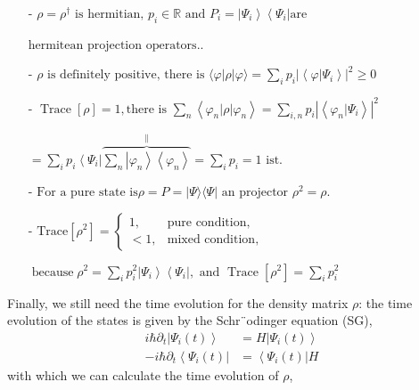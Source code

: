 \begin{enumerate}
    \item[-] $\rho=\rho^{\dagger} \text { is hermitian, } p_{i} \in \mathbb{R} \text { and } P_{i}=\left|\Psi_{i}\right\rangle\left\langle\Psi_{i}\right| \text {are}$ 
    \item[]$\text{hermitean projection operators.}$.
    \item[-] $\rho \text { is definitely positive, there is }\langle\varphi|\rho| \varphi\rangle=\sum_{i} p_{i}\left|\left\langle\varphi | \Psi_{i}\right\rangle\right|^{2}  \geq 0$ 
    \item[-] $\operatorname{Trace}[\rho]=1, \text{there is } \sum_{n}\left\langle\varphi_{n}|\rho| \varphi_{n}\right\rangle=\sum_{i, n} p_{i}\left|\left\langle\varphi_{n} | \Psi_{i}\right\rangle\right|^{2}$ 
    \item[] $=\sum_{i} p_{i}\left\langle\Psi_{i}\right| \overbrace{\sum_{n}\left|\varphi_{n}\right\rangle\left\langle\varphi_{n}\right\rangle}^{\|}=\sum_{i} p_{i}=1 \text { ist. }$ 
    \item[-] $\text{For a pure state is}\rho=P=|\Psi\rangle\langle\Psi| \text{ an projector } \rho^{2}=\rho$.
     
    \item[-] $\text{Trace}[\rho^2]=\left\{
        \begin{array}{ll}
            1, & \text{pure condition},\\
            <1, & \text{mixed condition},
        \end{array} 
        \right.$
    \item[] $\operatorname{because} \rho^{2}=\sum_{i} p_{i}^{2}\left|\Psi_{i}\right\rangle\left\langle\Psi_{i}\right|, \text { and } \operatorname{Trace}\left[\rho^{2}\right]=\sum_{i} p_{i}^{2}$ 
\end{enumerate}
Finally, we still need the time evolution for the density matrix $\rho$: the time evolution of the states is given by the Schr¨odinger equation (SG),
\begin{equation}
\begin{aligned} i \hbar \partial_{t}\left|\Psi_{i}(t)\right\rangle &= H\left|\Psi_{i}(t)\right\rangle \\- i \hbar \partial_{t}\left\langle\Psi_{i}(t)\right| &=\left\langle\Psi_{i}(t)\right| H \end{aligned}
\end{equation}
with which we can calculate the time evolution of $\rho$,

